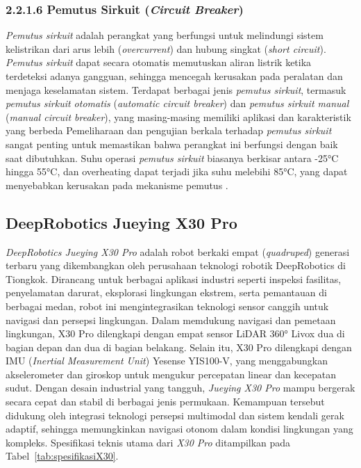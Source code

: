 \subsubsection{2.2.1.6 Pemutus Sirkuit (\emph{Circuit Breaker})}
\emph{Pemutus sirkuit} adalah perangkat yang berfungsi untuk melindungi sistem kelistrikan dari arus lebih (\emph{overcurrent}) dan hubung singkat (\emph{short circuit}). \emph{Pemutus sirkuit} dapat secara otomatis memutuskan aliran listrik ketika terdeteksi adanya gangguan, sehingga mencegah kerusakan pada peralatan dan menjaga keselamatan sistem. Terdapat berbagai jenis \emph{pemutus sirkuit}, termasuk \emph{pemutus sirkuit otomatis} (\emph{automatic circuit breaker}) dan \emph{pemutus sirkuit manual} (\emph{manual circuit breaker}), yang masing-masing memiliki aplikasi dan karakteristik yang berbeda Pemeliharaan dan pengujian berkala terhadap \emph{pemutus sirkuit} sangat penting untuk memastikan bahwa perangkat ini berfungsi dengan baik saat dibutuhkan. Suhu operasi \emph{pemutus sirkuit} biasanya berkisar antara -25°C hingga 55°C, dan overheating dapat terjadi jika suhu melebihi 85°C, yang dapat menyebabkan kerusakan pada mekanisme pemutus \cite{Ilomets2020}.

\subsection{DeepRobotics Jueying X30 Pro}
\textit{DeepRobotics Jueying X30 Pro} adalah robot berkaki empat (\textit{quadruped}) generasi terbaru yang dikembangkan oleh perusahaan teknologi robotik DeepRobotics di Tiongkok. Dirancang untuk berbagai aplikasi industri seperti inspeksi fasilitas, penyelamatan darurat, eksplorasi lingkungan ekstrem, serta pemantauan di berbagai medan, robot ini mengintegrasikan teknologi sensor canggih untuk navigasi dan persepsi lingkungan. Dalam memdukung navigasi dan pemetaan lingkungan, X30 Pro dilengkapi dengan empat sensor LiDAR 360° Livox dua di bagian depan dan dua di bagian belakang.  Selain itu, X30 Pro dilengkapi dengan IMU (\textit{Inertial Measurement Unit}) Yesense YIS100-V, yang menggabungkan akselerometer dan giroskop untuk mengukur percepatan linear dan kecepatan sudut. 
Dengan desain industrial yang tangguh, \textit{Jueying X30 Pro} mampu bergerak secara cepat dan stabil di berbagai jenis permukaan. Kemampuan tersebut didukung oleh integrasi teknologi persepsi multimodal dan sistem kendali gerak adaptif, sehingga memungkinkan navigasi otonom dalam kondisi lingkungan yang kompleks. Spesifikasi teknis utama dari \textit{X30 Pro} ditampilkan pada Tabel~\ref{tab:spesifikasiX30}.


